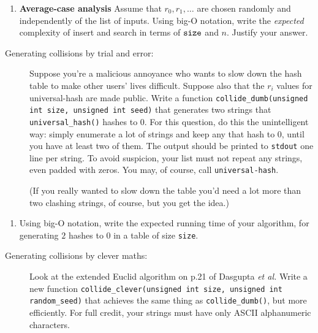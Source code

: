 \documentclass[11pt]{article}
\newcommand{\size}{{\tt size}}
\begin{document}
\begin{enumerate}[resume]
    \item {\bf Average-case analysis}
        Assume that $r_0, r_1, \ldots$ are chosen randomly and independently of the list of inputs.
        Using big-O notation,
        write the \emph{expected} complexity of insert and search in terms of $\size$ and $n$.
        Justify your answer.
\end{enumerate}

\begin{description}
    \item[Generating collisions by trial and error: ]
        Suppose you're a malicious annoyance who wants to slow down the hash table to make other users' lives difficult.
        Suppose also that the $r_i$ values for universal-hash are made public.
        Write a function
        {\tt collide\_dumb(unsigned int size, unsigned int seed)}
        that generates two strings that {\tt universal\_hash()} hashes to 0.
        For this question, do this the unintelligent way: simply enumerate a lot of
        strings and keep any that hash to 0, until you have at least two of them.
        The output should be printed to {\tt stdout} one line per string.
        To avoid suspicion, your list must not repeat any strings, even padded with zeros.
        You may, of course, call {\tt universal-hash}.

(If you really wanted to slow down the table you'd need a lot more than two clashing strings,
of course,
but you get the idea.)
\end{description}

\begin{enumerate}[resume]
\item Using big-O notation,
    write the expected running time of your algorithm,
    for generating $2$ hashes to 0 in a table of size {\tt size}.
\end{enumerate}

\begin{description}
\item[Generating collisions by clever maths: ]
    Look at the extended Euclid algorithm on p.21 of Dasgupta {\it et al.}
        Write a new function
        {\tt collide\_clever(unsigned int size, unsigned int random\_seed)}
        that achieves the same thing as {\tt collide\_dumb()},
        but more efficiently.
        For full credit,
        your strings must have only ASCII alphanumeric characters.
\end{description}
\end{document}
